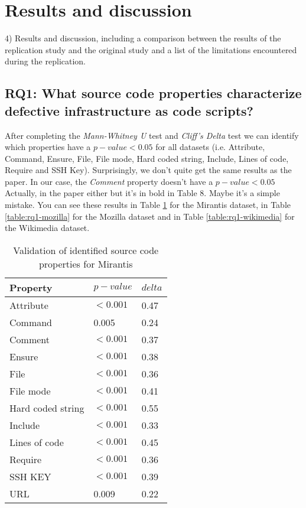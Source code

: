 
\section{Results and discussion}
4) Results and discussion, including a comparison between the results of the 
replication study and the original study and a list of the limitations 
encountered during the replication.
\subsection{RQ1: What source code properties characterize defective 
infrastructure as code scripts?}
After completing the \emph{Mann-Whitney U} test and \emph{Cliff's Delta} test
we can identify which properties have a $p-value < 0.05$ for all datasets (i.e. 
Attribute, Command, Ensure, File, File mode, Hard coded string, Include, Lines 
of code, Require and SSH Key). Surprisingly, we don't quite get the same results 
as the paper. In our case, the \emph{Comment} property doesn't have a $p-value < 0.05$
Actually, in the paper either but it's in bold in Table 8. Maybe it's a simple 
mistake. You can see these results in Table \ref{table:rq1-mirantis} for the 
Mirantis dataset, in Table \ref{table:rq1-mozilla} for the Mozilla dataset and 
in Table \ref{table:rq1-wikimedia} for the Wikimedia dataset.


\begin{table}[h]
    \caption{Validation of identified source code properties for Mirantis}
    \label{table:rq1-mirantis}
    \centering
    \begin{tabular}{|l|l|l|}
    \hline
        Property & $p-value$ & $delta$ \\ \hline
        Attribute & $<0.001$ & 0.47 \\ \hline
        Command & 0.005 & 0.24 \\ \hline
        Comment & $<0.001$ & 0.37 \\ \hline
        Ensure & $<0.001$ & 0.38 \\ \hline
        File & $<0.001$ & 0.36 \\ \hline
        File mode & $<0.001$ & 0.41 \\ \hline
        Hard coded string & $<0.001$ & 0.55 \\ \hline
        Include & $<0.001$ & 0.33 \\ \hline
        Lines of code & $<0.001$ & 0.45 \\ \hline
        Require & $<0.001$ & 0.36 \\ \hline
        SSH KEY & $<0.001$ & 0.39 \\ \hline
        URL & 0.009 & 0.22 \\ \hline
    \end{tabular}
\end{table}

